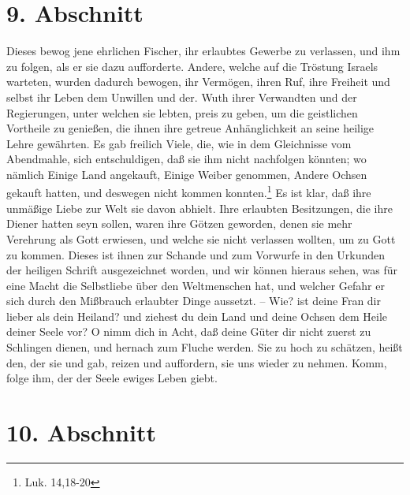 \section{9. Abschnitt}

Dieses bewog jene ehrlichen Fischer, ihr erlaubtes Gewerbe zu verlassen, und ihm zu folgen, als er sie dazu aufforderte. Andere, welche auf die Tröstung Israels warteten, wurden dadurch bewogen, ihr Vermögen, ihren Ruf, ihre Freiheit und selbst ihr Leben dem Unwillen und der. Wuth ihrer Verwandten und der Regierungen, unter welchen sie lebten, preis zu geben, um die geistlichen Vortheile zu genießen, die ihnen ihre getreue Anhänglichkeit an seine heilige Lehre gewährten. Es gab freilich Viele, die, wie in dem Gleichnisse vom Abendmahle, sich entschuldigen, daß sie ihm nicht nachfolgen könnten; wo nämlich Einige Land angekauft, Einige Weiber genommen, Andere Ochsen gekauft hatten, und deswegen nicht kommen konnten.\footnote{Luk. 14,18-20} Es ist klar, daß ihre unmäßige Liebe zur Welt sie davon abhielt. Ihre erlaubten Besitzungen, die ihre Diener hatten seyn sollen, waren ihre Götzen geworden, denen sie mehr Verehrung als Gott erwiesen, und welche sie nicht verlassen wollten, um zu Gott zu kommen. Dieses ist ihnen zur Schande und zum Vorwurfe in den Urkunden der heiligen Schrift ausgezeichnet worden, und wir können hieraus sehen, was für eine Macht die Selbstliebe über den Weltmenschen hat, und welcher Gefahr er sich durch den Mißbrauch erlaubter Dinge aussetzt. -- Wie? ist deine Fran dir lieber als dein Heiland? und ziehest du dein Land und deine Ochsen dem Heile deiner Seele vor? O nimm dich in Acht, daß deine Güter dir nicht zuerst zu Schlingen dienen, und hernach zum Fluche werden. Sie zu hoch zu schätzen, heißt den, der sie und gab, reizen und auffordern, sie uns wieder zu nehmen. Komm, folge ihm, der der Seele ewiges Leben giebt.

\section{10. Abschnitt}

